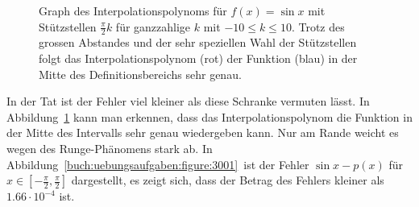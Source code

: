 \begin{loesung}
\begin{figure}
\caption{Graph des Interpolationspolynoms für $f(x)=\sin x$ mit Stützstellen
$\frac{\pi}2k$ für ganzzahlige $k$ mit $-10\le k\le 10$.
Trotz des grossen Abstandes und der sehr speziellen Wahl der Stützstellen 
folgt das Interpolationspolynom (rot) der Funktion (blau) in der Mitte des
Definitionsbereichs sehr genau.
\label{buch:uebungsaufgaben:figure:3001plot}}
\end{figure}%
In der Tat ist der Fehler viel kleiner als diese Schranke vermuten lässt.
In Abbildung~\ref{buch:uebungsaufgaben:figure:3001plot} kann man
erkennen, dass das Interpolationspolynom die Funktion in der Mitte
des Intervalls sehr genau wiedergeben kann.
Nur am Rande weicht es wegen des Runge-Phänomens stark ab.
In Abbildung~\ref{buch:uebungsaufgaben:figure:3001} ist der Fehler
$\sin x -p(x)$ für $x\in[-\frac{\pi}2,\frac{\pi}2]$ dargestellt, es zeigt
sich, dass der Betrag des Fehlers kleiner als $1.66\cdot 10^{-4}$ ist.
\end{loesung}

